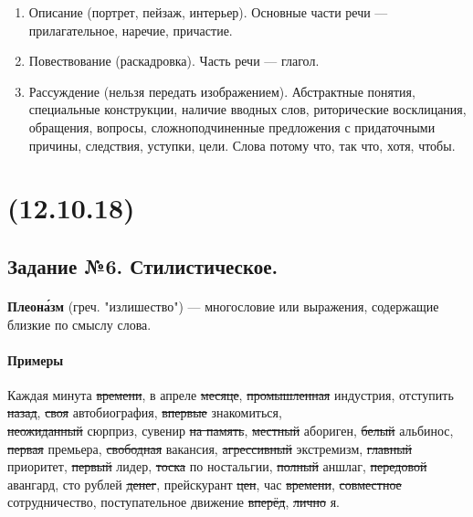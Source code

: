 \documentclass{article}
\begin{document}
\begin{enumerate}
\item
  Описание (портрет, пейзаж, интерьер). Основные части речи --- прилагательное, наречие, причастие.
\item
  Повествование (раскадровка). Часть речи --- глагол.
\item
  Рассуждение (нельзя передать изображением). Абстрактные понятия, специальные конструкции, наличие вводных слов,
  риторические восклицания, обращения, вопросы, сложноподчиненные предложения с придаточными причины, следствия,
  уступки, цели. Слова потому что, так что, хотя, чтобы.
\end{enumerate}

\newpage
\noindent\makebox[\linewidth]{\rule{\paperwidth}{0.4pt}}
\section{(12.10.18)}
\noindent\makebox[\linewidth]{\rule{\paperwidth}{0.4pt}}

\subsection{Задание №6. Стилистическое.}
\paragraph{}
\textbf{Плеон\'{а}зм} (греч. "излишество") --- многословие или выражения, содержащие близкие по смыслу слова.

\paragraph{Примеры} Каждая минута \sout{времени}, в апреле \sout{месяце}, \sout{промышленная} индустрия,
отступить \sout{назад}, \sout{своя} автобиография, \sout{впервые} знакомиться,\\
\sout{неожиданный} сюрприз, сувенир \sout{на память},
\sout{местный} абориген, \sout{белый} альбинос, \sout{первая} премьера, \sout{свободная} вакансия,
\sout{агрессивный} экстремизм, \sout{главный} приоритет, \sout{первый} лидер, \sout{тоска} по ностальгии,
\sout{полный} аншлаг, \sout{передовой} авангард, сто рублей \sout{денег}, прейскурант \sout{цен},
час \sout{времени}, \sout{совместное} сотрудничество, поступательное движение \sout{вперёд}, \sout{лично} я.

\paragraph{}
\end{document}
